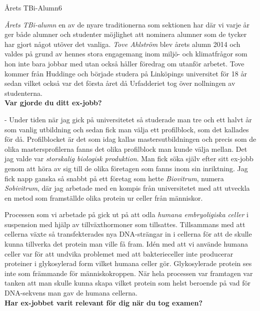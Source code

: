 \begin{news}{2}{Årets TBi-Alumn}{}{}{6}{}


\emph{Årets TBi-alumn} en av de nyare traditionerna som sektionen har där vi varje 
år ger både alumner och studenter möjlighet att nominera alumner som de 
tycker har gjort något utöver det vanliga. \emph{Tove Ahlström} blev årets alumn 
2014 och valdes på grund av hennes stora engagemang inom miljö- och 
klimatfrågor som hon inte bara jobbar med utan också håller föredrag om 
utanför arbetet. Tove kommer från Huddinge och började studera på Linköpings 
universitet för 18 år sedan vilket också var det första året då Urfadderiet 
tog över nollningen av studenterna.
\\
 
\noindent \textbf{Var gjorde du ditt ex-jobb?}
 
 - Under tiden när jag gick på universitetet så studerade man tre och ett halvt 
 år som vanlig utbildning och sedan fick man välja ett profilblock, som det 
kallades för då. Profilblocket är det som idag kallas mastersutbildningen och 
precis som de olika mastersprofilerna fanns det olika profilblock man kunde 
välja mellan. Det jag valde var \emph{storskalig biologisk produktion}. Man fick 
söka själv efter sitt ex-jobb genom att höra av sig till de olika företagen 
som fanns inom sin inriktning. Jag fick napp ganska så snabbt på ett företag 
som hette \emph{Biovitrum}, numera \emph{Sobivitrum}, där jag arbetade med en kompis från 
universitetet med att utveckla en metod som framställde olika protein ur 
celler från människor.

Processen som vi arbetade på gick ut på att odla \emph{humana embryoligiska celler} 
i suspension med hjälp av tillväxthormoner som tillsattes. Tillsammans med 
att cellerna växte så transfekterades nya DNA-strängar in i cellerna för att 
de skulle kunna tillverka det protein man ville få fram. Idén med att 
vi använde humana celler var för att undvika problemet med att bakterieceller 
inte producerar proteiner i glykosylerad form vilket humana celler gör. 
Glykosylerade protein ses inte som främmande för människokroppen. När hela 
processen var framtagen var tanken att man skulle kunna skapa vilket protein 
som helst beroende på vad för DNA-sekvens man gav de humana cellerna.
\\
 
\noindent \textbf{Har ex-jobbet varit relevant för dig när du tog examen?}


\end{news}
